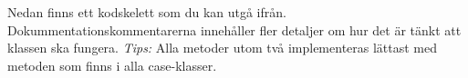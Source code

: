 \noindent Nedan finns ett kodskelett som du kan utgå ifrån. Dokummentationskommentarerna innehåller fler detaljer om hur det är tänkt att klassen ska fungera. %
 \emph{Tips:} Alla metoder utom två implementeras lättast med metoden  som finns i alla case-klasser.

\begin{figure}[H]
\label{code:classes:graphics:rectanglesequence}
\end{figure}


